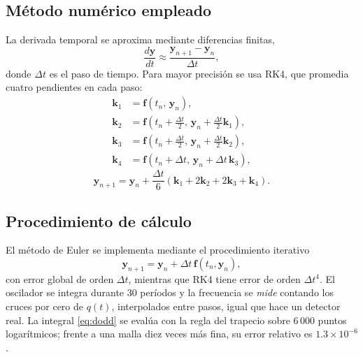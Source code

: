 \documentclass[10pt,onecolumn]{article}
\numberwithin{equation}{section}
\numberwithin{figure}{section}
\numberwithin{table}{section}
\begin{document}
\subsection{Método numérico empleado}

La derivada temporal se aproxima mediante diferencias finitas,
\begin{equation}
    \frac{d\mathbf y}{dt}
    \approx
    \frac{\mathbf y_{n+1}-\mathbf y_n}{\Delta t},
    \label{eq:diferencias_finitas}
\end{equation}
donde $\Delta t$ es el paso de tiempo. Para mayor precisión se usa RK4, que promedia cuatro pendientes en cada paso:
\begin{equation}
\begin{aligned}
 \mathbf k_1&=\mathbf f(t_n,\,\mathbf y_n),\\
 \mathbf k_2&=\mathbf f\!\left(t_n+\tfrac{\Delta t}{2},\,\mathbf y_n+\tfrac{\Delta t}{2}\mathbf k_1\right),\\
 \mathbf k_3&=\mathbf f\!\left(t_n+\tfrac{\Delta t}{2},\,\mathbf y_n+\tfrac{\Delta t}{2}\mathbf k_2\right),\\
 \mathbf k_4&=\mathbf f(t_n+\Delta t,\,\mathbf y_n+\Delta t\,\mathbf k_3),
\end{aligned}
\label{eq:rk4_k}
\end{equation}
\begin{equation}
 \mathbf y_{n+1}=\mathbf y_n+\frac{\Delta t}{6}\left(\mathbf k_1+2\mathbf k_2+2\mathbf k_3+\mathbf k_4\right).
 \label{eq:rk4}
\end{equation}

\subsection{Procedimiento de cálculo}

El método de Euler se implementa mediante el procedimiento iterativo
\begin{equation}
    \mathbf y_{n+1}=\mathbf y_n+\Delta t\, \mathbf f(t_n,\mathbf y_n),
    \label{eq:euler}
\end{equation}
con error global de orden $\Delta t$, mientras que RK4 tiene error de orden $\Delta t^4$. El oscilador se integra
durante 30 períodos y la frecuencia se \emph{mide} contando los cruces por cero de $q(t)$, interpolados entre pasos,
igual que hace un detector real. La integral \eqref{eq:dodd} se evalúa con la regla del trapecio sobre 6\,000
puntos logarítmicos; frente a una malla diez veces más fina, su error relativo es $1.3\times10^{-6}$.
\end{document}
